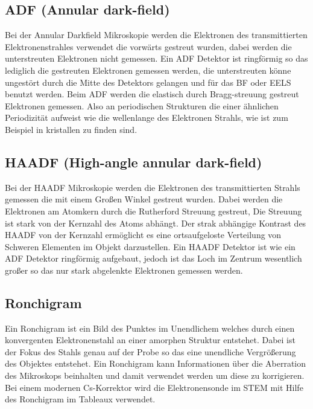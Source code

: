 \subsection{ADF (Annular dark-field)}
Bei der Annular Darkfield Mikroskopie werden die Elektronen des transmittierten Elektronenstrahles verwendet die vorwärts gestreut wurden, dabei werden die unterstreuten Elektronen nicht gemessen.  Ein ADF Detektor ist ringförmig so das lediglich die gestreuten Elektronen gemessen werden, die unterstreuten könne ungestört durch die Mitte des Detektors gelangen und für das BF oder EELS benutzt werden.  Beim ADF werden die elastisch durch Bragg-streuung gestreut Elektronen gemessen. Also an periodischen Strukturen die einer ähnlichen Periodizität aufweist wie die wellenlange des Elektronen Strahls, wie ist zum Beispiel in kristallen zu finden sind. 

\subsection{HAADF (High-angle annular dark-field)}
Bei der HAADF Mikroskopie werden die Elektronen des transmittierten Strahls gemessen die mit einem Großen Winkel gestreut wurden. Dabei werden die Elektronen am Atomkern durch die Rutherford Streuung gestreut, Die Streuung ist stark von der Kernzahl des Atoms abhängt. Der strak abhängige Kontrast des HAADF von der Kernzahl ermöglicht es eine ortsaufgeloste Verteilung von Schweren Elementen im Objekt darzustellen. Ein HAADF Detektor ist wie ein ADF Detektor ringförmig aufgebaut, jedoch ist das Loch im Zentrum wesentlich großer so das nur stark abgelenkte Elektronen gemessen werden.

\subsection{Ronchigram}
Ein Ronchigram ist ein Bild des Punktes im Unendlichem welches durch einen konvergenten Elektronenstahl an einer amorphen Struktur entstehet. Dabei ist der Fokus des Stahls genau auf der Probe so das eine unendliche Vergrößerung des Objektes entstehet. Ein Ronchigram kann Informationen über die Aberration des Mikroskops beinhalten und damit verwendet werden um diese zu korrigieren. Bei einem modernen Cs-Korrektor wird die Elektronensonde im STEM mit Hilfe des Ronchigram im Tableaux verwendet.

